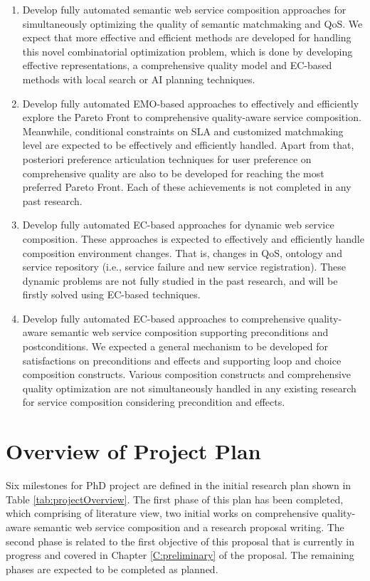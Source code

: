 \begin{enumerate}
 \item Develop fully automated semantic web service composition approaches for simultaneously optimizing the quality of semantic matchmaking and QoS. We expect that more effective and efficient methods are developed for handling this novel combinatorial optimization problem, which is done by developing effective representations, a comprehensive quality model and EC-based methods with local search or AI planning techniques.

\item Develop fully automated EMO-based approaches to effectively and efficiently explore the Pareto Front to comprehensive quality-aware service composition. Meanwhile, conditional constraints on SLA and customized matchmaking level are expected to be effectively and efficiently handled. Apart from that, posteriori preference articulation techniques for user preference on comprehensive quality are also to be developed for reaching the most preferred Pareto Front. Each of these achievements is not completed in any past research.

\item Develop fully automated EC-based approaches for dynamic web service composition. These approaches is expected to effectively and efficiently handle composition environment changes. That is, changes in QoS, ontology and service repository (i.e., service failure and new service registration). These dynamic problems are not fully studied in the past research, and will be firstly solved using EC-based techniques.

\item Develop fully automated EC-based approaches to comprehensive quality-aware semantic web service composition supporting preconditions and postconditions. We expected a general mechanism to be developed for satisfactions on preconditions and effects and supporting loop and choice composition constructs. Various composition constructs and comprehensive quality optimization are not simultaneously handled in any existing research for service composition considering precondition and effects.
\end{enumerate}

\section{Overview of Project Plan}

Six milestones for PhD project are defined in the initial research plan shown in Table \ref{tab:projectOverview}. The first phase of this plan has been completed, which comprising of literature view, two initial works on comprehensive quality-aware semantic web service composition and a research proposal writing. The second phase is related to the first objective of this proposal that is currently in progress and covered in Chapter \ref{C:preliminary} of the proposal. The remaining phases are expected to be completed as planned.


